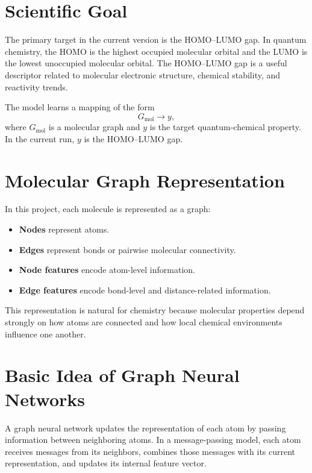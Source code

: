 \documentclass[11pt]{article}
\begin{document}
\section{Scientific Goal}

The primary target in the current version is the HOMO--LUMO gap. In quantum chemistry, the HOMO is the highest occupied molecular orbital and the LUMO is the lowest unoccupied molecular orbital. The HOMO--LUMO gap is a useful descriptor related to molecular electronic structure, chemical stability, and reactivity trends.

The model learns a mapping of the form
\begin{equation}
    G_{\mathrm{mol}} \longrightarrow y,
\end{equation}
where $G_{\mathrm{mol}}$ is a molecular graph and $y$ is the target quantum-chemical property. In the current run, $y$ is the HOMO--LUMO gap.

\section{Molecular Graph Representation}

In this project, each molecule is represented as a graph:
\begin{itemize}[leftmargin=1.5em]
    \item \textbf{Nodes} represent atoms.
    \item \textbf{Edges} represent bonds or pairwise molecular connectivity.
    \item \textbf{Node features} encode atom-level information.
    \item \textbf{Edge features} encode bond-level and distance-related information.
\end{itemize}

This representation is natural for chemistry because molecular properties depend strongly on how atoms are connected and how local chemical environments influence one another.

\section{Basic Idea of Graph Neural Networks}

A graph neural network updates the representation of each atom by passing information between neighboring atoms. In a message-passing model, each atom receives messages from its neighbors, combines those messages with its current representation, and updates its internal feature vector.
\end{document}
